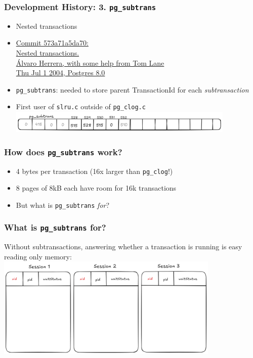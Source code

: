 \begin{frame}
  \frametitle{Development History: 3. \texttt{pg\_subtrans}}
  \begin{itemize}
    \item Nested transactions
    \item {\linksize \href{https://git.postgresql.org/cgit/postgresql.git/commit/?id=573a71a5da70d6e2503c8f53e3b4f26b3b6d738d}
      {Commit 573a71a5da70: \faExternalLink \\
      Nested transactions. \\
      Álvaro Herrera, with some help from Tom Lane \\
      Thu Jul 1 2004, Postgres 8.0}}
    \item \texttt{pg\_subtrans}: needed to store parent TransactionId for each \textit{subtransaction}
    \item First user of \texttt{slru.c} outside of \texttt{pg\_clog.c}
  \includegraphics[width=0.85\textwidth]{pg_subtrans.png}
  \end{itemize}
\end{frame}

\begin{frame}
  \frametitle{How does \texttt{pg\_subtrans} work?}
  \begin{itemize}
    \item 4 bytes per transaction (16x larger than \texttt{pg\_clog}!)
    \item 8 pages of 8kB each have room for 16k transactions
    \item But what is \texttt{pg\_subtrans} \emph{for}?
  \end{itemize}
\end{frame}

\begin{frame}
  \frametitle{What is \texttt{pg\_subtrans} for?}
  Without subtransactions, answering whether a transaction is running
  is easy reading only memory:
  \includegraphics[width=0.8\textwidth]{pgproc-no-subxids.png}
\end{frame}

